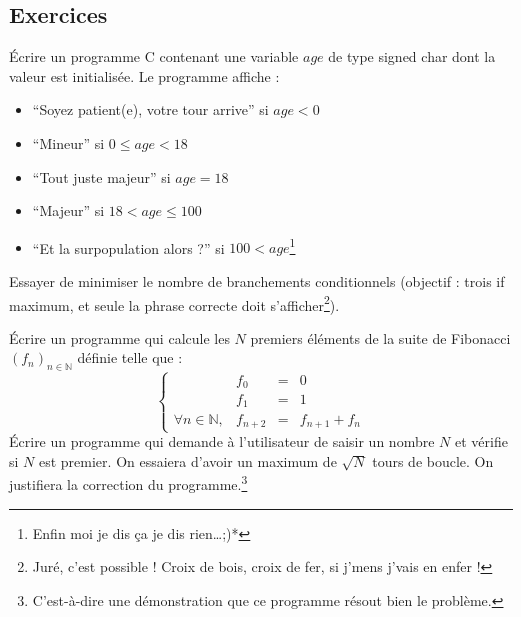 \documentclass[../../../main.tex]{subfiles}
\begin{document}
\subsection{Exercices}
 Écrire un programme C contenant une variable $age$ de type \textsf{signed char} dont la valeur est initialisée. Le programme affiche :
\begin{itemize}
	\item ``Soyez patient(e), votre tour arrive'' si $age < 0$
	\item ``Mineur'' si $0 \leq age < 18$
	\item ``Tout juste majeur'' si $age = 18$
	\item ``Majeur'' si $18 < age \leq{100}$
	\item ``Et la surpopulation alors ?'' si $100 < age$\footnote{Enfin moi je dis ça je dis rien\dots;)*}
\end{itemize}
Essayer de minimiser le nombre de branchements conditionnels (objectif : trois \textsf{if} maximum, et seule la phrase correcte doit s'afficher\footnote{Juré, c'est possible ! Croix de bois, croix de fer, si j'mens j'vais en enfer !}).
 
 Écrire un programme qui calcule les $N$ premiers éléments de la suite de Fibonacci $(f_{n})_{n\in{\mathbb{N}}}$ définie telle que :
$$
\left\{\begin{array}{llcl}
& f_{0} & = & 0 \\
& f_{1} & = & 1 \\
\forall{n\in{\mathbb{N}}}, & f_{n+2} & = & f_{n+1} + f_{n}
\end{array}\right.
$$
Écrire un programme qui demande à l'utilisateur de saisir un nombre $N$ et vérifie si $N$ est premier. On essaiera d'avoir un maximum de $\sqrt{N}$ tours de boucle. On justifiera la correction du programme.\footnote{C'est-à-dire une démonstration que ce programme résout bien le problème.}
\end{document}
